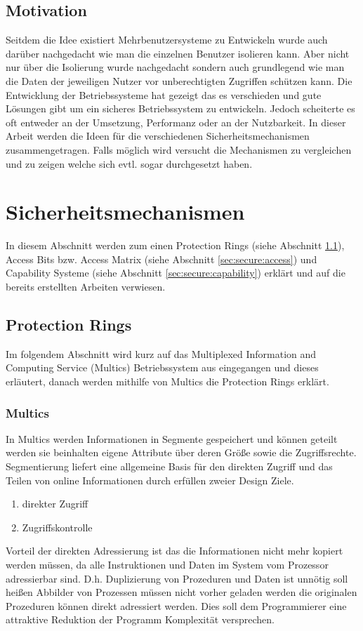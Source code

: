 \documentclass[11pt,technote]{IEEEtran}
\begin{document}
    \subsection{Motivation}
     Seitdem die Idee existiert Mehrbenutzersysteme zu Entwickeln wurde auch dar\"uber nachgedacht wie man die einzelnen Benutzer isolieren kann.
     Aber nicht nur \"uber die Isolierung wurde nachgedacht sondern auch grundlegend wie man die Daten 
     der jeweiligen Nutzer vor unberechtigten Zugriffen sch\"utzen kann.
     Die Entwicklung der Betriebssysteme hat gezeigt das es verschieden und gute L\"osungen gibt um ein sicheres Betriebssystem zu entwickeln.
     Jedoch scheiterte es oft entweder an der Umsetzung, Performanz oder an der Nutzbarkeit. 
     In dieser Arbeit werden die Ideen f\"ur die verschiedenen Sicherheitsmechanismen zusammengetragen.
     Falls m\"oglich wird versucht die Mechanismen zu vergleichen und zu zeigen welche sich evtl. sogar durchgesetzt haben.
     
  \section{Sicherheitsmechanismen} \label{sec:secure}
    In diesem Abschnitt werden zum einen Protection Rings (siehe Abschnitt \ref{sec:secure:protectrings}), Access Bits bzw. Access Matrix 
    (siehe Abschnitt \ref{sec:secure:access}) und Capability Systeme (siehe Abschnitt \ref{sec:secure:capability}) erkl\"art und 
    auf die bereits erstellten Arbeiten verwiesen.
    \subsection{Protection Rings} \label{sec:secure:protectrings}
      Im folgendem Abschnitt wird kurz auf das Multiplexed Information and Computing Service (Multics) Betriebssystem
      aus \cite{inproc:multics} eingegangen und dieses erl\"autert, danach werden mithilfe von Multics die Protection Rings erkl\"art.
      \subsubsection{Multics}  
        In Multics werden Informationen in Segmente gespeichert und k\"onnen geteilt 
				werden sie beinhalten eigene Attribute \"uber deren Gr\"o\ss e sowie die Zugriffsrechte.
				Segmentierung liefert eine allgemeine Basis f\"ur den direkten Zugriff und das Teilen von online Informationen durch erf\"ullen zweier Design Ziele.
		    \begin{enumerate}
		      \item direkter Zugriff
		      \item Zugriffskontrolle
        \end{enumerate}
		    Vorteil der direkten Adressierung ist das die Informationen nicht mehr kopiert werden m\"ussen, da alle Instruktionen und Daten
		    im System vom Prozessor adressierbar sind. D.h. Duplizierung von Prozeduren und Daten ist unn\"otig soll hei\ss en Abbilder von Prozessen m\"ussen
		    nicht vorher geladen werden die originalen Prozeduren k\"onnen direkt adressiert werden.
		    Dies soll dem Programmierer eine attraktive Reduktion der Programm Komplexit\"at versprechen.
		  
\end{document}
